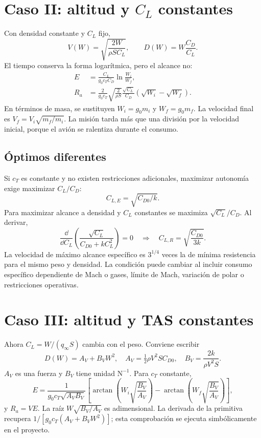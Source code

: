 \section{Caso II: altitud y $C_L$ constantes}
Con densidad constante y $C_L$ fijo,
\begin{equation}
V(W)=\sqrt{\frac{2W}{\rho SC_L}},\qquad D(W)=W\frac{C_D}{C_L}.
\end{equation}
El tiempo conserva la forma logarítmica, pero el alcance no:
\begin{align}
E&=\frac{C_L}{g_0c_TC_D}\ln\frac{W_i}{W_f},\\
R_a&=\frac{2}{g_0c_T}\sqrt{\frac{2}{\rho S}}
\frac{\sqrt{C_L}}{C_D}(\sqrt{W_i}-\sqrt{W_f}).
\label{eq:jet-CL}
\end{align}
En términos de masa, se sustituyen $W_i=g_0m_i$ y $W_f=g_0m_f$. La velocidad final es $V_f=V_i\sqrt{m_f/m_i}$. La misión tarda más que una división por la velocidad inicial, porque el avión se ralentiza durante el consumo.

\subsection{Óptimos diferentes}
Si $c_T$ es constante y no existen restricciones adicionales, maximizar autonomía exige maximizar $C_L/C_D$:
\begin{equation}
C_{L,E}=\sqrt{C_{D0}/k}.
\end{equation}
Para maximizar alcance a densidad y $C_L$ constantes se maximiza $\sqrt{C_L}/C_D$. Al derivar,
\begin{equation}
\frac{\dd}{\dd C_L}\left(\frac{\sqrt{C_L}}{C_{D0}+kC_L^2}\right)=0
\quad\Longrightarrow\quad C_{L,R}=\sqrt{\frac{C_{D0}}{3k}}.
\end{equation}
La velocidad de máximo alcance específico es $3^{1/4}$ veces la de mínima resistencia para el mismo peso y densidad. La condición puede cambiar al incluir consumo específico dependiente de Mach o gases, límite de Mach, variación de polar o restricciones operativas.

\section{Caso III: altitud y TAS constantes}
Ahora $C_L=W/(q_\infty S)$ cambia con el peso. Conviene escribir
\begin{equation}
D(W)=A_V+B_VW^2,\quad
A_V=\tfrac12\rho V^2SC_{D0},\quad B_V=\frac{2k}{\rho V^2S}.
\end{equation}
$A_V$ es una fuerza y $B_V$ tiene unidad $\mathrm{N^{-1}}$. Para $c_T$ constante,
\begin{equation}
E=\frac{1}{g_0c_T\sqrt{A_VB_V}}
\left[\arctan\!\left(W_i\sqrt{\frac{B_V}{A_V}}\right)
-\arctan\!\left(W_f\sqrt{\frac{B_V}{A_V}}\right)\right],
\label{eq:jet-arctan}
\end{equation}
y $R_a=VE$. La raíz $W\sqrt{B_V/A_V}$ es adimensional. La derivada de la primitiva recupera $1/[g_0c_T(A_V+B_VW^2)]$; esta comprobación se ejecuta simbólicamente en el proyecto.

